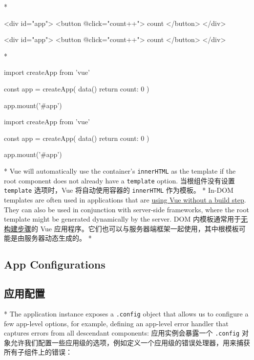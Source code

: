 \begin{paracol}{2}
\switchcolumn[0]*%
\begin{codeHtml}
<div id="app">
<button @click="count++">{{ count }}</button>
</div>
\end{codeHtml}
\switchcolumn
\begin{codeHtml}
<div id="app">
<button @click="count++">{{ count }}</button>
</div>
\end{codeHtml}


\switchcolumn[0]*%
\begin{codeJs}
import { createApp } from 'vue'

const app = createApp({
    data() {
    return {
        count: 0
    }
    }
})

app.mount('#app')
\end{codeJs}
\switchcolumn
\begin{codeJs}
import { createApp } from 'vue'

const app = createApp({
    data() {
    return {
        count: 0
    }
    }
})

app.mount('#app')
\end{codeJs}


\switchcolumn[0]*%
Vue will automatically use the container's \texttt{innerHTML} as the
template if the root component does not already have a \texttt{template}
option.
\switchcolumn
当根组件没有设置 \texttt{template} 选项时，Vue 将自动使用容器的
\texttt{innerHTML} 作为模板。
\switchcolumn[0]*%
In-DOM templates are often used in applications that are
\href{https://vuejs.org/guide/quick-start.html\#using-vue-from-cdn}{using
Vue without a build step}. They can also be used in conjunction with
server-side frameworks, where the root template might be generated
dynamically by the server.
\switchcolumn
DOM
内模板通常用于\href{https://cn.vuejs.org/guide/quick-start.html\#using-vue-from-cdn}{无构建步骤}的
Vue
应用程序。它们也可以与服务器端框架一起使用，其中根模板可能是由服务器动态生成的。
\switchcolumn[0]*%
\subsection{App Configurations}
\switchcolumn
\subsection{应用配置}
\switchcolumn[0]*%
The application instance exposes a \texttt{.config} object that allows
us to configure a few app-level options, for example, defining an
app-level error handler that captures errors from all descendant
components:
\switchcolumn
应用实例会暴露一个 \texttt{.config}
对象允许我们配置一些应用级的选项，例如定义一个应用级的错误处理器，用来捕获所有子组件上的错误：


\end{paracol}

